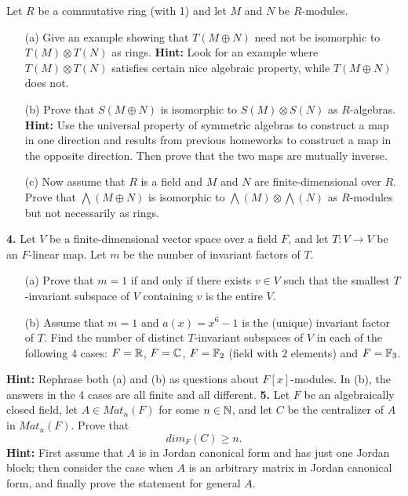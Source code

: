 \documentclass[12pt]{amsart}
\begin{document}
 Let $R$ be a commutative ring (with 1) and let $M$ and $N$
be $R$-modules.
\begin{itemize}
\item[(a)] Give an example showing that $T(M\oplus N)$ need not be isomorphic
to $T(M)\otimes T(N)$ as rings. {\bf Hint:} Look for an example where
$T(M)\otimes T(N)$ satisfies certain nice algebraic property, while
$T(M\oplus N)$ does not.
\item[(b)] Prove that $S(M\oplus N)$ is isomorphic to $S(M)\otimes S(N)$
as $R$-algebras. {\bf Hint:} Use the universal property of symmetric algebras
to construct a map in one direction and results from previous homeworks 
to construct a map in the opposite direction. Then prove that the two maps
are mutually inverse.
\item[(c)] Now assume that $R$ is a field and $M$ and $N$ are finite-dimensional
over $R$. Prove that $\bigwedge (M\oplus N)$ is isomorphic to
$\bigwedge(M)\otimes \bigwedge(N)$ as $R$-modules but not necessarily
as rings.
\end{itemize}
\skv
{\bf 4.} Let $V$ be a finite-dimensional vector space over a field $F$,
and let $T:V\to V$ be an $F$-linear map. Let $m$ be the number of invariant factors
of $T$.
\begin{itemize}
\item[(a)] Prove that $m=1$ if and only if there exists $v\in V$ such that
the smallest $T$-invariant subspace of $V$ containing $v$ is the entire $V$.
\item[(b)] Assume that $m=1$ and $a(x)=x^6-1$ is the (unique) invariant factor
of $T$. Find the number of distinct $T$-invariant subspaces of $V$
in each of the following 4 cases: $F={\mathbb R}$, $F={\mathbb C}$, $F={\mathbb F}_2$ (field with
$2$ elements) and $F={\mathbb F}_3$. 
 \end{itemize}
{\bf Hint:} Rephrase both (a) and (b) as questions about $F[x]$-modules.
In (b), the answers in the 4 cases are all finite and all different.
\skv
\skv
{\bf 5.} Let $F$ be an algebraically closed field, let $A\in Mat_n (F)$
for some $n\in{\mathbb N}$, and let $C$ be the centralizer of $A$ in $Mat_n (F)$.
Prove that $$dim_F(C)\geq n.$$ {\bf Hint:} First assume that $A$ is in Jordan
canonical form and has just one Jordan block; then consider the case when
$A$ is an arbitrary matrix in Jordan canonical form, and finally prove
the statement for general $A$.
\end{document}
